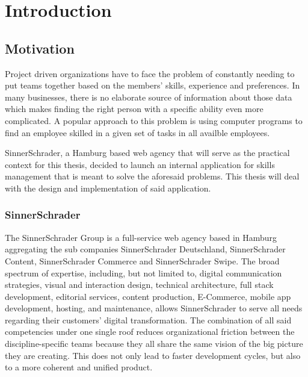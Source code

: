 \chapter{Introduction}

\section{Motivation}
Project driven organizations have to face the problem of constantly needing to put teams together based on the members’ skills, experience and preferences.
In many businesses, there is no elaborate source of information about those data which makes finding the right person with a specific ability even more complicated. A popular approach to this problem is using computer programs to find an employee skilled in a given set of tasks in all availble employees.

SinnerSchrader, a Hamburg based web agency that will serve as the practical context for this thesis, decided to launch an internal application for skills management that is meant to solve the aforesaid problems. This thesis will deal with the design and implementation of said application.



\subsection{SinnerSchrader}

The SinnerSchrader Group is a full-service web agency based in Hamburg aggregating the sub companies SinnerSchrader Deutschland, SinnerSchrader Content, SinnerSchrader Commerce and SinnerSchrader Swipe. The broad spectrum of expertise, including, but not limited to, digital communication strategies, visual and interaction design,  technical architecture, full stack development, editorial services, content production, E-Commerce, mobile app development, hosting, and maintenance, allows SinnerSchrader to serve all needs regarding their customers' digital transformation. The combination of all said competencies under one single roof reduces organizational friction between the discipline-specific teams because they all share the same vision of the big picture they are creating. This does not only lead to faster development cycles, but also to a more coherent and unified product.

